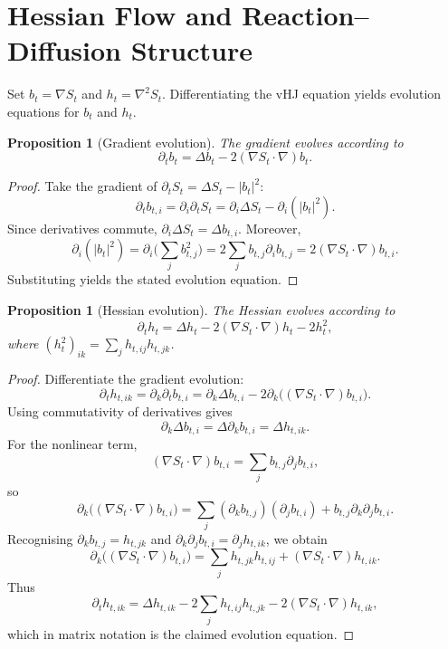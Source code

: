 \documentclass[11pt]{article}
\newtheorem{proposition}[theorem]{Proposition}
\begin{document}
\section{Hessian Flow and Reaction--Diffusion Structure}

Set $b_t = \nabla S_t$ and $h_t = \nabla^2 S_t$.  Differentiating the
vHJ equation yields evolution equations for $b_t$ and $h_t$.

\begin{proposition}[Gradient evolution]
The gradient evolves according to
\begin{equation}
  \partial_t b_t = \Delta b_t - 2(\nabla S_t\cdot\nabla)b_t.
\end{equation}
\end{proposition}

\begin{proof}
Take the gradient of $\partial_t S_t = \Delta S_t - |b_t|^2$:
\[
  \partial_t b_{t,i}
  = \partial_i\partial_t S_t
  = \partial_i\Delta S_t - \partial_i(|b_t|^2).
\]
Since derivatives commute, $\partial_i\Delta S_t = \Delta b_{t,i}$.
Moreover,
\[
  \partial_i(|b_t|^2)
  = \partial_i\Big(\sum_j b_{t,j}^2\Big)
  = 2\sum_j b_{t,j}\partial_i b_{t,j}
  = 2(\nabla S_t\cdot\nabla)b_{t,i}.
\]
Substituting yields the stated evolution equation.
\end{proof}

\begin{proposition}[Hessian evolution]
The Hessian evolves according to
\begin{equation}
  \partial_t h_t = \Delta h_t - 2(\nabla S_t\cdot\nabla)h_t - 2h_t^2,
\end{equation}
where $(h_t^2)_{ik} = \sum_j h_{t,ij}h_{t,jk}$.
\end{proposition}

\begin{proof}
Differentiate the gradient evolution:
\[
  \partial_t h_{t,ik}
  = \partial_k\partial_t b_{t,i}
  = \partial_k\Delta b_{t,i}
    - 2\partial_k\big((\nabla S_t\cdot\nabla)b_{t,i}\big).
\]
Using commutativity of derivatives gives
\[
  \partial_k\Delta b_{t,i}
  = \Delta\partial_k b_{t,i}
  = \Delta h_{t,ik}.
\]
For the nonlinear term,
\[
  (\nabla S_t\cdot\nabla)b_{t,i}
  = \sum_j b_{t,j}\partial_j b_{t,i},
\]
so
\[
  \partial_k\big((\nabla S_t\cdot\nabla)b_{t,i}\big)
  = \sum_j (\partial_k b_{t,j})(\partial_j b_{t,i})
      + b_{t,j}\partial_k\partial_j b_{t,i}.
\]
Recognising $\partial_k b_{t,j}=h_{t,jk}$ and
$\partial_k\partial_j b_{t,i} = \partial_j h_{t,ik}$, we obtain
\[
  \partial_k\big((\nabla S_t\cdot\nabla)b_{t,i}\big)
  = \sum_j h_{t,jk}h_{t,ij}
      + (\nabla S_t\cdot\nabla)h_{t,ik}.
\]
Thus
\[
  \partial_t h_{t,ik}
  = \Delta h_{t,ik}
    - 2\sum_j h_{t,ij}h_{t,jk}
    - 2(\nabla S_t\cdot\nabla)h_{t,ik},
\]
which in matrix notation is the claimed evolution equation.
\end{proof}
\end{document}
